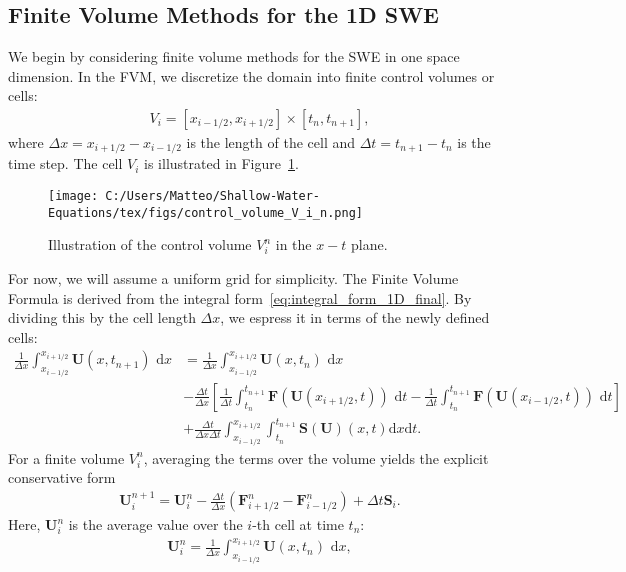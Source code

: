 \subsection{Finite Volume Methods for the 1D SWE}
We begin by considering finite volume methods for the SWE in one space dimension.
In the FVM, we discretize the domain into finite control volumes or cells:
\begin{align*}
    V_i = [x_{i-1/2}, x_{i+1/2}] \times [t_n, t_{n+1}],
\end{align*}
where $\Delta x = x_{i+1/2} - x_{i-1/2}$ is the length of the cell and $\Delta t = t_{n+1} - t_n$ is the time step.
The cell $V_i$ is illustrated in Figure~\ref{fig:control_volume_V_i_n}.
\begin{figure}[H]
    \centering
    \texttt{[image: C:/Users/Matteo/Shallow-Water-Equations/tex/figs/control\_volume\_V\_i\_n.png]}
    \caption{Illustration of the control volume $V_i^n$ in the $x-t$ plane.}\label{fig:control_volume_V_i_n}
\end{figure}
For now, we will assume a uniform grid for simplicity.
The Finite Volume Formula is derived from the integral form~\eqref{eq:integral_form_1D_final}.
By dividing this by the cell length $\Delta x$, we espress it in terms of the newly defined cells:
\begin{align*}
    \frac{1}{\Delta x} \int_{x_{i-1/2}}^{x_{i+1/2}} \mathbf{U}(x,t_{n+1}) \text{ d}x &= \frac{1}{\Delta x} \int_{x_{i-1/2}}^{x_{i+1/2}} \mathbf{U}(x,t_n) \text{ d}x\\
    & - \frac{\Delta t}{\Delta x} \left[ \frac{1}{\Delta t} \int_{t_n}^{t_{n+1}} \mathbf{F}(\mathbf{U}(x_{i+1/2}, t)) \text{ d}t
    - \frac{1}{\Delta t} \int_{t_n}^{t_{n+1}} \mathbf{F}(\mathbf{U}(x_{i-1/2}, t)) \text{ d}t \right] \\
    &+ \frac{\Delta t}{\Delta x \Delta t} \int_{x_{i-1/2}}^{x_{i+1/2}} \int_{t_n}^{t_{n+1}} \mathbf{S(U)}(x,t) \text{d}x \text{d}t.
\end{align*}
For a finite volume $V_i^n$, averaging the terms over the volume yields the explicit conservative form
\begin{align}\label{eq:explicit_conservative_1D_SWE}
    \mathbf{U}_i^{n+1} = \mathbf{U}_i^n - \frac{\Delta t}{\Delta x} \left( \mathbf{F}_{i+1/2}^n - \mathbf{F}_{i-1/2}^n \right) + \Delta t \mathbf{S}_i.
\end{align}
Here, $\mathbf{U}_i^n$ is the average value over the $i$-th cell at time $t_n$:
\begin{align}
    \mathbf{U}_i^n = \frac{1}{\Delta x} \int_{x_{i-1/2}}^{x_{i+1/2}} \mathbf{U}(x,t_n) \text{ d}x,
\end{align}
